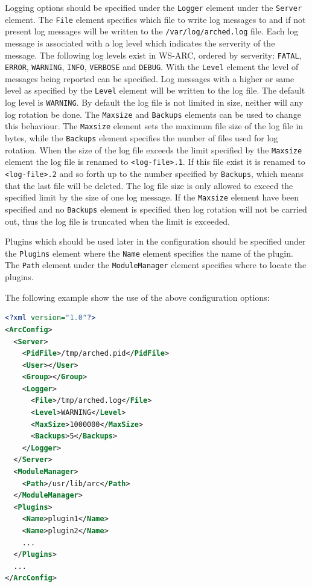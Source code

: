 \documentclass{article}
\begin{document}
Logging options should be specified under the \texttt{Logger} element under the
\texttt{Server} element. The \texttt{File} element specifies which file to write
log messages to and if not present log messages will be written to the
\texttt{/var/log/arched.log} file. Each log message is associated with a log
level which indicates the serverity of the message. The following log levels
exist in WS-ARC, ordered by serverity: \texttt{FATAL}, \texttt{ERROR},
\texttt{WARNING}, \texttt{INFO}, \texttt{VERBOSE} and \texttt{DEBUG}. With
the \texttt{Level} element the level of messages being reported can be
specified. Log messages with a higher or same level as specified by the
\texttt{Level} element will be written to the log file. The default log level is
\texttt{WARNING}. \newline
By default the log file is not limited in size, neither
will any log rotation be done. The \texttt{Maxsize} and \texttt{Backups}
elements can be used to change this behaviour. The \texttt{Maxsize} element sets
the maximum file size of the log file in bytes, while the \texttt{Backups}
element specifies the number of files used for log rotation. When the size of
the log file exceeds the limit specified by the \texttt{Maxsize} element the log
file is renamed to \texttt{<log-file>.1}. If this file exist it is renamed to
\texttt{<log-file>.2} and so forth up to the number specified by
\texttt{Backups}, which means that the last file will be deleted. The log file
size is only allowed to exceed the specified limit by the size of one log
message. If the \texttt{Maxsize} element have been specified and no
\texttt{Backups} element is specified then log rotation will not be carried out,
thus the log file is truncated when the limit is exceeded.

Plugins which should be used later in the configuration should be specified
under the \texttt{Plugins} element where the \texttt{Name} element specifies the
name of the plugin. The \texttt{Path} element under the \texttt{ModuleManager}
element specifies where to locate the plugins.

The following example show the use of the above configuration options:
\begin{lstlisting}[language=xml]
<?xml version="1.0"?>
<ArcConfig>
  <Server>
    <PidFile>/tmp/arched.pid</PidFile>
    <User></User>
    <Group></Group>
    <Logger>
      <File>/tmp/arched.log</File>
      <Level>WARNING</Level>
      <MaxSize>1000000</MaxSize>
      <Backups>5</Backups>
    </Logger>
  </Server>
  <ModuleManager>
    <Path>/usr/lib/arc</Path>
  </ModuleManager>
  <Plugins>
    <Name>plugin1</Name>
    <Name>plugin2</Name>
    ...
  </Plugins>
  ...
</ArcConfig>
\end{lstlisting}
\end{document}
